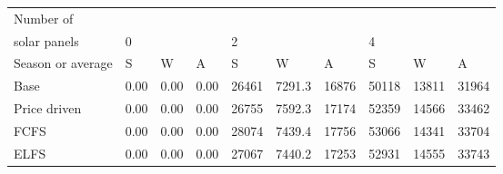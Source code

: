 \begin{table}[h] 
\centering 
\begin{tabular}{l|lll|lll|lll}Number of \\ solar panels&0& & &2& & &4& & \\ \hline 
Season or average & S & W & A & S & W & A & S & W & A \\ \hline 
Base&0.00&0.00&0.00&26461&7291.3&16876&50118&13811&31964 \\ 
Price driven&0.00&0.00&0.00&26755&7592.3&17174&52359&14566&33462 \\ 
FCFS&0.00&0.00&0.00&28074&7439.4&17756&53066&14341&33704 \\ 
ELFS&0.00&0.00&0.00&27067&7440.2&17253&52931&14555&33743 \\ 
\end{tabular} 
\end{table}